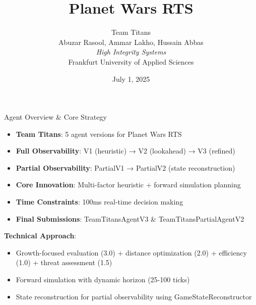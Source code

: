 \documentclass{beamer}
\title{Planet Wars RTS}
\author[Team Titans]{Team Titans\\Abuzar Rasool, Ammar Lakho, Hussain Abbas \\ \textit{High Integrity Systems}\\Frankfurt University of Applied Sciences}
\date{July 1, 2025}
\begin{document}
\frame{\titlepage}

\begin{frame}{Agent Overview \& Core Strategy}
  \begin{itemize}
    \item \textbf{Team Titans}: 5 agent versions for Planet Wars RTS
    \item \textbf{Full Observability}: V1 (heuristic) → V2 (lookahead) → V3 (refined)
    \item \textbf{Partial Observability}: PartialV1 → PartialV2 (state reconstruction)
    \item \textbf{Core Innovation}: Multi-factor heuristic + forward simulation planning
    \item \textbf{Time Constraints}: 100ms real-time decision making
    \item \textbf{Final Submissions}: TeamTitansAgentV3 \& TeamTitansPartialAgentV2
  \end{itemize}
  
  \vspace{0.3cm}
  \textbf{Technical Approach}:
  \begin{itemize}
    \item Growth-focused evaluation (3.0) + distance optimization (2.0) + efficiency (1.0) + threat assessment (1.5)
    \item Forward simulation with dynamic horizon (25-100 ticks)
    \item State reconstruction for partial observability using GameStateReconstructor
  \end{itemize}
\end{frame}
\end{document}
